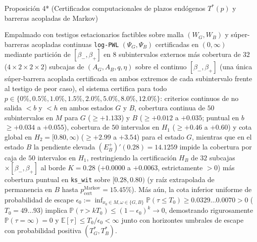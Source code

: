 \documentclass[11pt,letterpaper]{article}
\theoremstyle{plain}
\newtheorem*{namedthm}{\protect\namedthmname}
\newcommand{\namedthmname}{}
\newenvironment{thm_box}[1]{\renewcommand{\namedthmname}{#1}\begin{namedthm}}{\end{namedthm}}
\begin{document}
\begin{thm_box}{Proposición 4* (Certificados computacionales de plazos endógenos $T^*(p)$ y barreras acopladas de Markov)}
\begin{enumerate}
Empalmado con testigos estacionarios factibles sobre malla $(W_G, W_B)$ y súper-barreras acopladas continuas \texttt{log-PWL} $(\Psi_G,\Psi_B)$ certificadas en $(0,\infty)$ mediante partición de $[\beta_-,\beta_+]$ en $8$ subintervalos externos más cobertura de $32$ ($4\times 2\times 2\times 2$) subcajas de $(A_G,A_B,q,\eta)$ sobre el continuo $[\beta_-,\beta_+]$ (una única súper-barrera acoplada certificada en ambos extremos de cada subintervalo frente al testigo de peor caso), el sistema certifica para todo $p\in\{0\%,0.5\%,1.0\%,1.5\%,2.0\%,5.0\%,8.0\%,12.0\%\}$: criterios continuos de no salida $<b$ y $<h$ en ambos estados $G$ y $B$, cobertura continua de $50$ subintervalos en $M$ para $G$ ($\ge +1.133$) y $B$ ($\ge +0.012$ a $+0.035$; puntual en $b$ $\ge +0.034$ a $+0.055$), cobertura de $50$ intervalos en $H_1$ ($\ge +0.46$ a $+0.60$) y cota global en $H_2=[0.80,\infty)$ ($\ge +2.99$ a $+3.54$) para el estado $G$, mientras que en el estado $B$ la pendiente elevada $(E_B^+)'(0.28)=14.1259$ impide la cobertura por caja de $50$ intervalos en $H_1$, restringiendo la certificación $H_B$ de $32$ subcajas $\times [\beta_-,\beta_+]$ al borde $K=0.28$ ($+0.0000$ a $+0.0063$, estrictamente $>0$) más cobertura puntual en \texttt{ks\_wit} sobre $[0.28,0.80)$ (y raíz extrapolada de permanencia en $B$ hasta $p_{\mathrm{cert}}^{\mathrm{Markov}}=15.45\%$). Más aún, la cota inferior uniforme de probabilidad de escape $\epsilon_0 := \inf_{x_0\in M,\omega\in\{G,B\}} \mathbb{P}(\tau\le T_0) \ge 0.0329\dots 0.0070 > 0$ ($T_0=49\dots 93$) implica $\mathbb{P}(\tau > k T_0)\le (1-\epsilon_0)^k \to 0$, demostrando rigurosamente $\mathbb{P}(\tau=\infty)=0$ y $\mathbb{E}[\tau]\le T_0/\epsilon_0 < \infty$ junto con horizontes umbrales de escape con probabilidad positiva $(T^*_G,T^*_B)$.
\end{enumerate}
\end{thm_box}
\end{document}
